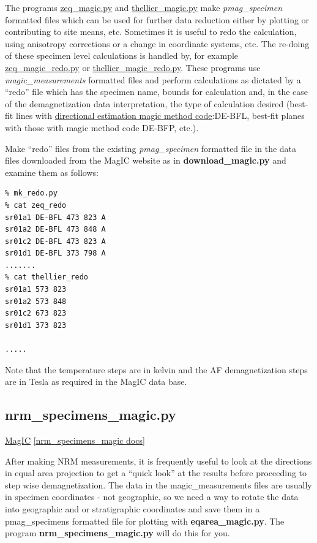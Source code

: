 \documentclass[11pt]{book}
\begin{document}
{{{The programs \href{#zeq_magic.py}{zeq\_magic.py} and \href{#thellier_magic.py}{thellier\_magic.py} make {\it pmag\_specimen} formatted files which can be used for further data reduction either by plotting or contributing to site means, etc.  Sometimes it is useful to redo the calculation, using anisotropy corrections or a change in coordinate systems, etc.  The re-doing of these specimen level calculations is handled by, for example \href{#zeq_magic_redo.py}{zeq\_magic\_redo.py} or \href{#thellier_magic_redo.py}{ thellier\_magic\_redo.py}.  These programs use {\it magic\_measurements} formatted files and perform calculations as dictated by a ``redo'' file which has the specimen name, bounds for calculation and, in the case of the demagnetization data interpretation, the type of calculation desired (best-fit lines with \href{http://earthref.org/cgi-bin/magic-s1-methods.cgi?database_name=magic\qquad &search_start=methods\qquad &category=Direction%20Estimation}{directional estimation magic method code}:{DE-BFL}, best-fit planes with those with  magic method code DE-BFP, etc.). 

 Make ``redo'' files from the existing  {\it pmag\_specimen} formatted file in the data files downloaded from the MagIC website as in {\bf download\_magic.py} and examine them as follows:

\begin{verbatim}
% mk_redo.py
% cat zeq_redo
sr01a1 DE-BFL 473 823 A 
sr01a2 DE-BFL 473 848 A 
sr01c2 DE-BFL 473 823 A 
sr01d1 DE-BFL 373 798 A 
.......
% cat thellier_redo
sr01a1 573 823 
sr01a2 573 848 
sr01c2 673 823 
sr01d1 373 823 

.....
\end{verbatim}

\noindent Note that the temperature steps are in kelvin and the AF demagnetization steps are in Tesla as required in the MagIC data base.    



%

\subsection{nrm\_specimens\_magic.py} 
\href{#MagIC}{MagIC}
\href{http://earthref.org/PmagPy/pmagpydocs/nrm_specimens_magic-module.html}{[nrm\_specimens\_magic docs]}

After making NRM measurements, it is frequently useful to look at the directions in equal area projection to get a ``quick look'' at the results before proceeding to step wise demagnetization.  The data in the magic\_measurements files are usually in specimen coordinates - not geographic, so we need a way to rotate the data into geographic and or stratigraphic coordinates and save them in a pmag\_specimens formatted file for plotting with {\bf eqarea\_magic.py}.   The program {\bf nrm\_specimens\_magic.py} will do this for you.  

}}}
\end{document}
